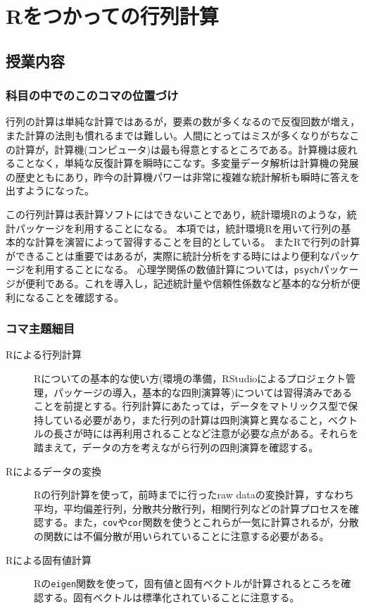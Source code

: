 \section{Rをつかっての行列計算}
\subsection{授業内容}
\subsubsection{科目の中でのこのコマの位置づけ}
行列の計算は単純な計算ではあるが，要素の数が多くなるので反復回数が増え，また計算の法則も慣れるまでは難しい。人間にとってはミスが多くなりがちなこの計算が，計算機(コンピュータ)は最も得意とするところである。計算機は疲れることなく，単純な反復計算を瞬時にこなす。多変量データ解析は計算機の発展の歴史ともにあり，昨今の計算機パワーは非常に複雑な統計解析も瞬時に答えを出すようになった。

この行列計算は表計算ソフトにはできないことであり，統計環境Rのような，統計パッケージを利用することになる。
本項では，統計環境Rを用いて行列の基本的な計算を演習によって習得することを目的としている。
またRで行列の計算ができることは重要ではあるが，実際に統計分析をする時にはより便利なパッケージを利用することになる。
心理学関係の数値計算については，\texttt{psych}パッケージが便利である。これを導入し，記述統計量や信頼性係数など基本的な分析が便利になることを確認する。
\subsubsection{コマ主題細目}
\begin{description}
    \item[Rによる行列計算] Rについての基本的な使い方(環境の準備，RStudioによるプロジェクト管理，パッケージの導入，基本的な四則演算等)については習得済みであることを前提とする。行列計算にあたっては，データをマトリックス型で保持している必要があり，また行列の計算は四則演算と異なること，ベクトルの長さが時には再利用されることなど注意が必要な点がある。それらを踏まえて，データの方を考えながら行列の四則演算を確認する。
    \item[Rによるデータの変換] Rの行列計算を使って，前時までに行ったraw dataの変換計算，すなわち平均，平均偏差行列，分散共分散行列，相関行列などの計算プロセスを確認する。また，\texttt{cov}や\texttt{cor}関数を使うとこれらが一気に計算されるが，分散の関数には不偏分散が用いられていることに注意する必要がある。
    \item[Rによる固有値計算] Rの\texttt{eigen}関数を使って，固有値と固有ベクトルが計算されるところを確認する。固有ベクトルは標準化されていることに注意する。
\end{description}
